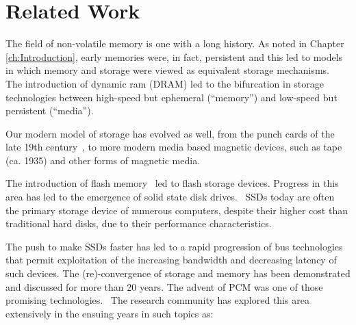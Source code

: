 
\chapter{Related Work}
\label{ch:RelatedWork}

The field of non-volatile memory is one with a long history.  As noted in Chapter \ref{ch:Introduction}, 
early memories were, in fact, persistent and this led to models in which memory and storage were viewed
as equivalent storage mechanisms.~\cite{corbato1965introduction}  The introduction of dynamic ram (\acs{DRAM})
led to the bifurcation in storage technologies between high-speed but ephemeral (``memory'') and low-speed
but persistent (``media'').~\cite{US3728695A}

Our modern model of storage has evolved as well, from the punch cards of the late 19th century~\cite{truesdell1965development},
to more modern media based magnetic devices, such as tape (ca. 1935) and other forms of magnetic
media.~\cite{feynman1992there, hoagland2003history}

The introduction of flash memory~\cite{masuoka1984new} led to flash storage devices.  Progress in this area has led to the
emergence of solid state disk drives.~\cite{clay1995flash}  \acs{SSD}s today are often the primary storage device of numerous
computers, despite their higher cost than traditional hard disks, due to their performance characteristics.

The push to make \acs{SSD}s faster has led to a rapid progression of bus technologies that permit exploitation of the 
increasing bandwidth and decreasing latency of such devices.  The (re)-convergence of storage and memory has been demonstrated 
and discussed for more than 20 years.\cite{wu1994envy,mogul2009operating,Nalli:2017:APM:3093336.3037730,Nalli:2017:APM:3093337.3037730,
Nalli:2017:APM:3037697.3037730,kolli2017architecting,joshi2015efficient}  
The advent of \acs{PCM} was one of those promising
technologies.~\cite{chen2016review}  The research community has explored this area extensively in the ensuing years in such topics as:

